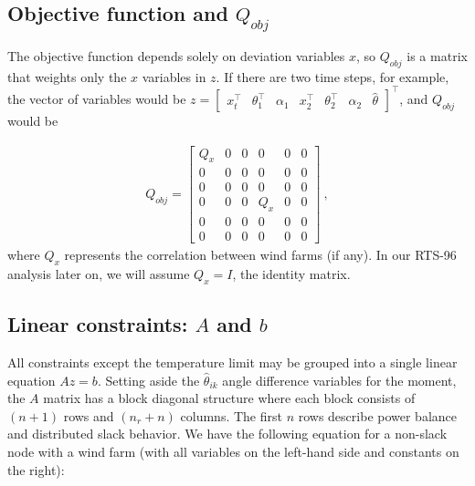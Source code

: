 \documentclass[conference]{IEEEtran}
\begin{document}
\subsection{Objective function and $Q_{obj}$}

The objective function depends solely on deviation variables $x$, so $Q_{obj}$ is a matrix that weights only the $x$ variables in $z$. If there are two time steps, for example, the vector of variables would be $z = \begin{bmatrix}x_t^\top & \theta_1^\top & \alpha_1 & x_2^\top & \theta_2^\top & \alpha_2 & \hat{\theta}\end{bmatrix}^\top$, and $Q_{obj}$ would be

\begin{align*}
Q_{obj} = \begin{bmatrix} Q_x & 0 & 0 & 0 & 0 & 0 \\ 0 & 0 & 0 & 0 & 0 & 0 \\ 0 & 0  & 0 & 0 & 0 & 0 \\ 0 & 0 & 0 & Q_x & 0 & 0 \\ 0 & 0 & 0 & 0 & 0 & 0 \\ 0 & 0 & 0 & 0 & 0 & 0\end{bmatrix}~,
\end{align*}
where $Q_x$ represents the correlation between wind farms (if any). In our RTS-96 analysis later on, we will assume $Q_x=I$, the identity matrix.

\subsection{Linear constraints: $A$ and $b$}

All constraints except the temperature limit may be grouped into a single linear equation $Az=b$. Setting aside the $\hat{\theta}_{ik}$ angle difference variables for the moment, the $A$ matrix has a block diagonal structure where each block consists of $(n+1)$ rows and $(n_r+n)$ columns. The first $n$ rows describe power balance and distributed slack behavior. We have the following equation for a non-slack node with a wind farm (with all variables on the left-hand side and constants on the right):
\end{document}
